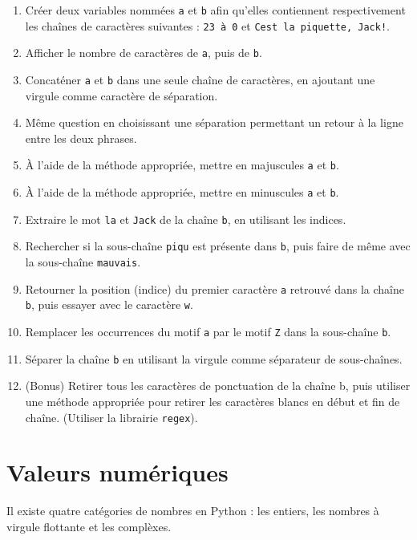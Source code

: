 \documentclass[
  12pt,
]{book}
\makeatletter
\providecommand{\tightlist}{%
  \setlength{\itemsep}{0pt}\setlength{\parskip}{0pt}}
\numberwithin{equation}{section}
\numberwithin{countremarque}{section}
\newenvironment{exframe}{%
 \def\at@end@of@exframe{}%
 \ifinner\ifhmode%
  \def\at@end@of@exframe{\end{minipage}}%
  \begin{minipage}{\columnwidth}%
 \fi\fi%
 \def\FrameCommand##1{\hskip\@totalleftmargin \hskip-\fboxsep
 \colorbox{shadecolorex}{##1}\hskip-\fboxsep
     \hskip-\linewidth \hskip-\@totalleftmargin \hskip\columnwidth}%
 \MakeFramed {\advance\hsize-\width
   \@totalleftmargin\z@ \linewidth\hsize
   \@setminipage}}%
 {\par\unskip\endMakeFramed%
 \at@end@of@exframe}
\makeatother
\begin{document}
\begin{exframe}
\begin{enumerate}
\def\labelenumi{\arabic{enumi}.}
\tightlist
\item
  Créer deux variables nommées \texttt{a} et \texttt{b} afin qu'elles contiennent respectivement les chaînes de caractères suivantes : \texttt{23\ à\ 0} et \texttt{C\textquotesingle{}est\ la\ piquette,\ Jack!}.
\item
  Afficher le nombre de caractères de \texttt{a}, puis de \texttt{b}.
\item
  Concaténer \texttt{a} et \texttt{b} dans une seule chaîne de caractères, en ajoutant une virgule comme caractère de séparation.
\item
  Même question en choisissant une séparation permettant un retour à la ligne entre les deux phrases.
\item
  À l'aide de la méthode appropriée, mettre en majuscules \texttt{a} et \texttt{b}.
\item
  À l'aide de la méthode appropriée, mettre en minuscules \texttt{a} et \texttt{b}.
\item
  Extraire le mot \texttt{la} et \texttt{Jack} de la chaîne \texttt{b}, en utilisant les indices.
\item
  Rechercher si la sous-chaîne \texttt{piqu} est présente dans \texttt{b}, puis faire de même avec la sous-chaîne \texttt{mauvais}.
\item
  Retourner la position (indice) du premier caractère \texttt{a} retrouvé dans la chaîne \texttt{b}, puis essayer avec le caractère \texttt{w}.
\item
  Remplacer les occurrences du motif \texttt{a} par le motif \texttt{Z} dans la sous-chaîne \texttt{b}.
\item
  Séparer la chaîne \texttt{b} en utilisant la virgule comme séparateur de sous-chaînes.
\item
  (Bonus) Retirer tous les caractères de ponctuation de la chaîne b, puis utiliser une méthode appropriée pour retirer les caractères blancs en début et fin de chaîne. (Utiliser la librairie \texttt{regex}).
\end{enumerate}
\end{exframe}

\section{Valeurs numériques}\label{valeurs-numuxe9riques}

Il existe quatre catégories de nombres en Python : les entiers, les nombres à virgule flottante et les complèxes.
\end{document}
